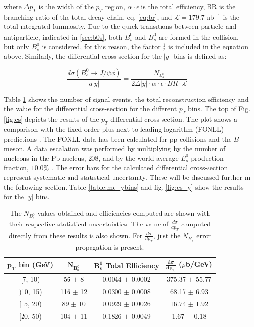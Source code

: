 where $\Delta p_T$ is the width of the $p_T$ region, $\alpha \cdot \epsilon$ is the total efficiency, BR is the branching ratio of the total decay chain, eq. \ref{eq:br}, and $\mathcal{L} = 179.7$ nb$^{-1}$  is the total integrated luminosity. Due to the quick transitions between particle and antiparticle, indicated in \ref{sec:b0s}, both $B^0_s$ and $\bar{B^0_s}$ are formed in the collision, but only $B^0_s$ is considered, for this reason, the factor $\frac{1}{2}$ is included in the equation above. Similarly, the differential cross-section for the $|y|$ bins is defined as: 

\begin{equation}
	\label{eq:cs_y}
	\frac{d \sigma(B_s^0 \to J/\psi\phi)}{d|y|} = \frac{N_{B^0_s}}{2 \Delta |y| \cdot \alpha \cdot \epsilon \cdot BR \cdot \mathcal{L}}
\end{equation}

Table \ref{table:result_raw_fdfu} shows the number of signal events, the total reconstruction efficiency and the value for the differential cross-section for the different $p_T$ bins. The top of Fig. \ref{fig:cs} depicts the results of the $p_T$ differential cross-section. The plot shows a comparison with the fixed-order plus next-to-leading-logarithm (FONLL) predictions \cite{FONLL}. The FONLL data has been calculated for pp collisions and the $B$ meson. A data escalation was performed by multiplying by the number of nucleons in the Pb nucleus, 208, and by the world average $B^{0}_s$ production fraction, $10.0 \%$ \cite{khachatryan2016study, pdgadmixture}. The error bars for the calculated differential cross-section represent systematic and statistical uncertainty. These will be discussed further in the following section. Table \ref{table:mc_ybins} and fig. \ref{fig:cs_y} show the results for the $|y|$ bins. 

\begin{table}[htbp] \begin{center}\begin{tabular}{|c|c|c|c|}\hline\textbf{$\mathbf{p_T}$ bin (GeV)} & \textbf{$\mathbf{N_{B_s^{0}}}$} & \textbf{$\mathbf{B_s^{0}}$ Total Efficiency} & \textbf{${\mathbf{\frac{d \sigma}{dp_T}}}$ ($\mu$b/GeV)} \\\hline{[}7, 10{)} &  56  $\pm$  8 &   0.0044  $\pm$  0.0002 &   375.37  $\pm$  55.77 \\{)}10, 15{)} &  116  $\pm$  12 &   0.0300  $\pm$  0.0008 &   68.17  $\pm$  6.93 \\{[}15, 20{)} &  89  $\pm$  10 &   0.0929  $\pm$  0.0026 &   16.74  $\pm$  1.92 \\{[}20, 50{)} &  104  $\pm$  11 &   0.1826  $\pm$  0.0049 &   1.67  $\pm$  0.18 \\\hline\end{tabular}\caption{The $N_{B_s^{0}}$ values obtained and efficiencies computed are shown with their respective statistical uncertainties. The value of ${\frac{d \sigma}{dp_T}}$ computed directly from these results is also shown. For ${\frac{d \sigma}{dp_T}}$, just the $N_{B_s^{0}}$ error propagation is present.}\label{table:result_raw_fdfu}\end{center}\end{table}

